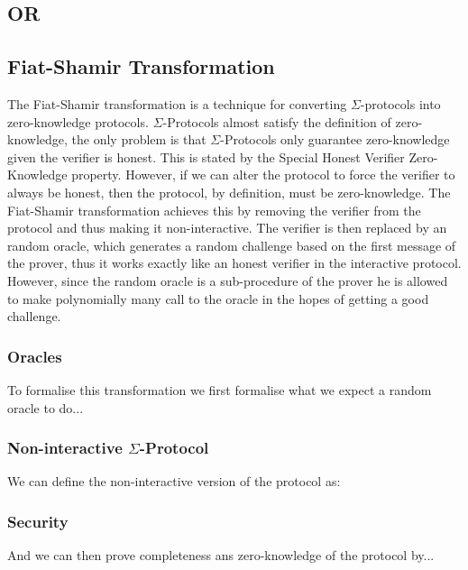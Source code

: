 \subsection{OR}
\label{subsec:sigma_OR}

\subsection{Fiat-Shamir Transformation}
\label{subsec:fiat-shamir}
The Fiat-Shamir transformation is a technique for converting $\Sigma$-protocols
into zero-knowledge protocols. $\Sigma$-Protocols almost satisfy the definition
of zero-knowledge, the only problem is that $\Sigma$-Protocols only guarantee
zero-knowledge given the verifier is honest. This is stated by the Special
Honest Verifier Zero-Knowledge property. However, if we can alter the protocol
to force the verifier to always be honest, then the protocol, by definition,
must be zero-knowledge.
The Fiat-Shamir transformation achieves this by removing the verifier from the
protocol and thus making it non-interactive. The verifier is then replaced by an
random oracle, which generates a random challenge based on the first message of
the prover, thus it works exactly like an honest verifier in the interactive
protocol. However, since the random oracle is a sub-procedure of the prover he
is allowed to make polynomially many call to the oracle in the hopes of getting
a good challenge.

\subsubsection{Oracles}
\label{subsec:sigma:fiat:oracle}


To formalise this transformation we first formalise what we expect a random
oracle to do...

\subsubsection{Non-interactive $\Sigma$-Protocol}
\label{subsec:sigma:fiat:protocol}

We can define the non-interactive version of the protocol as:

\subsubsection{Security}
\label{subsec:sigma:fiat:security}

And we can then prove completeness ans zero-knowledge of the protocol by...

